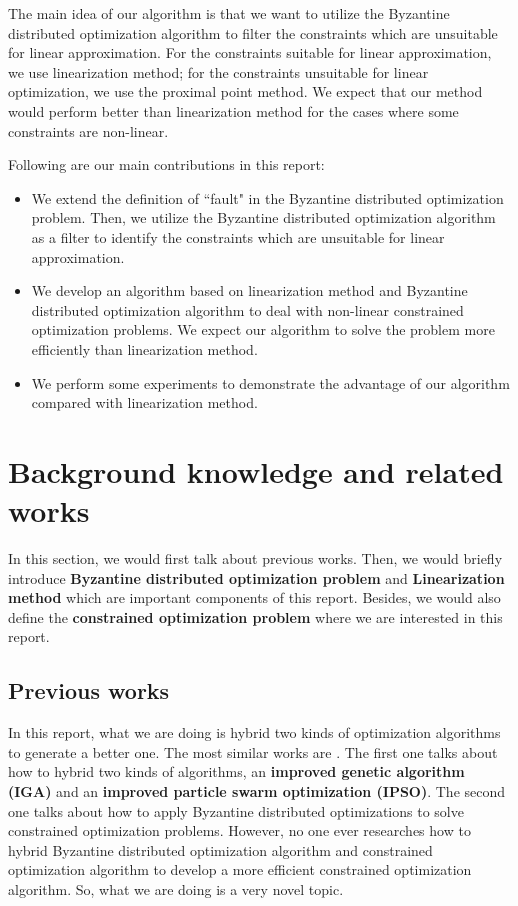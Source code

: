 \documentclass[conference]{IEEEtran}
\begin{document}
The main idea of our algorithm is that we want to utilize the Byzantine distributed optimization algorithm to filter the constraints which are unsuitable for linear approximation. For the constraints suitable for linear approximation, we use linearization method; for the constraints unsuitable for linear optimization, we use the proximal point method. We expect that our method would perform better than linearization method for the cases where some constraints are non-linear. 

Following are our main contributions in this report:
\begin{itemize}
    \item We extend the definition of ``fault" in the Byzantine distributed optimization problem. Then, we utilize the Byzantine distributed optimization algorithm as a filter to identify the constraints which are unsuitable for linear approximation.
    
    \item We develop an algorithm based on linearization method and Byzantine distributed optimization algorithm to deal with non-linear constrained optimization problems. We expect our algorithm to solve the problem more efficiently than linearization method.

    \item We perform some experiments to demonstrate the advantage of our algorithm compared with linearization method.
\end{itemize}


\section{Background knowledge and related works}\label{BKRW}
In this section, we would first talk about previous works. Then, we would briefly introduce \textbf{Byzantine distributed optimization problem} and \textbf{Linearization method} which are important components of this report. Besides, we would also define the \textbf{constrained optimization problem} where we are interested in this report.

\subsection{Previous works}
In this report, what we are doing is hybrid two kinds of optimization algorithms to generate a better one. The most similar works are \cite{li2010hybrid, xu2022resilient}. The first one talks about how to hybrid two kinds of algorithms, an \textbf{improved genetic algorithm (IGA)} and an \textbf{improved particle swarm optimization (IPSO)}. The second one talks about how to apply Byzantine distributed optimizations to solve constrained optimization problems. However, no one ever researches how to hybrid Byzantine distributed optimization algorithm and constrained optimization algorithm to develop a more efficient constrained optimization algorithm. So, what we are doing is a very novel topic. 
\end{document}
